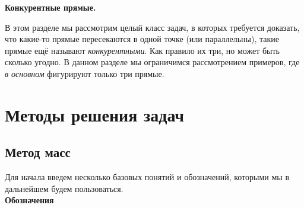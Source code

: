 \documentclass[14pt]{extarticle}
\theoremstyle{definition}
\theoremstyle{theorem}
\begin{document}
\begin{center}
	\textbf{\fontsize{23}{30}\selectfont Конкурентные прямые.}
\end{center}


В этом разделе мы рассмотрим целый класс
задач, в которых требуется доказать, что какие-то
прямые пересекаются в одной точке (или параллельны), такие прямые ещё называют
\textit{конкурентными}. Как правило их три, но может быть сколько угодно.
В данном разделе мы ограничимся рассмотрением примеров,
где \textit{в основном} фигурируют только три прямые.\\


\section*{Методы решения задач}

\subsection{Метод масс}
Для начала введем несколько базовых понятий и обозначений, которыми 
мы в дальнейшем будем пользоваться.\\

{\normalfont\fontsize{16}{16} \noindent \textbf{Обозначения}}
\end{document}
